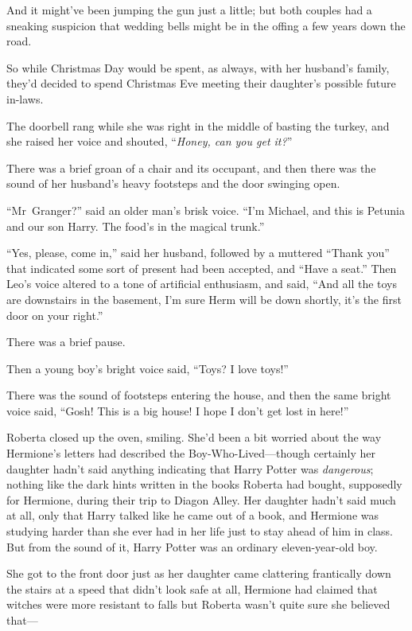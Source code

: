 And it might’ve been jumping the gun just a little; but both couples had a sneaking suspicion that wedding bells might be in the offing a few years down the road.

So while Christmas Day would be spent, as always, with her husband’s family, they’d decided to spend Christmas Eve meeting their daughter’s possible future in-laws.

The doorbell rang while she was right in the middle of basting the turkey, and she raised her voice and shouted, “\emph{Honey, can you get it?}”

There was a brief groan of a chair and its occupant, and then there was the sound of her husband’s heavy footsteps and the door swinging open.

“Mr~Granger?” said an older man’s brisk voice.
“I’m Michael, and this is Petunia and our son Harry. The food’s in the magical trunk.”

“Yes, please, come in,” said her husband, followed by a muttered
“Thank you” that indicated some sort of present had been accepted, and
“Have a seat.” Then Leo’s voice altered to a tone of artificial enthusiasm, and said,
“And all the toys are downstairs in the basement, I’m sure Herm will be down shortly, it’s the first door on your right.”

There was a brief pause.

Then a young boy’s bright voice said,
“Toys? I love toys!”

There was the sound of footsteps entering the house, and then the same bright voice said,
“Gosh! This is a big house! I hope I don’t get lost in here!”

Roberta closed up the oven, smiling. She’d been a bit worried about the way Hermione’s letters had described the Boy-Who-Lived—though certainly her daughter hadn’t said anything indicating that Harry Potter was \emph{dangerous}; nothing like the dark hints written in the books Roberta had bought, supposedly for Hermione, during their trip to Diagon Alley. Her daughter hadn’t said much at all, only that Harry talked like he came out of a book, and Hermione was studying harder than she ever had in her life just to stay ahead of him in class. But from the sound of it, Harry Potter was an ordinary eleven-year-old boy.

She got to the front door just as her daughter came clattering frantically down the stairs at a speed that didn’t look safe at all, Hermione had claimed that witches were more resistant to falls but Roberta wasn’t quite sure she believed that—


